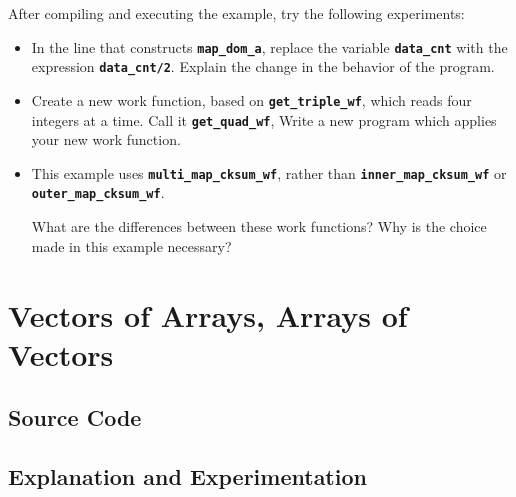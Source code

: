 \documentclass{report}
\begin{document}
After compiling and executing the example, try the following experiments:
\begin{itemize}
\item
In the line that constructs
\texttt{{\bf map\_dom\_a}},
replace the variable
\texttt{{\bf data\_cnt}}
with the expression
\texttt{{\bf data\_cnt/2}}.
Explain the change in the behavior of the program.

%

\item
Create a new work function, based on
\texttt{{\bf get\_triple\_wf}},
which reads four integers at a time.  Call it
\texttt{{\bf get\_quad\_wf}},
Write a new \stapl program which applies your new work function.

\item
This example uses
\texttt{{\bf multi\_map\_cksum\_wf}},
rather than
\linebreak[4] \texttt{{\bf inner\_map\_cksum\_wf}} or
\texttt{{\bf outer\_map\_cksum\_wf}}.

What are the differences between these work functions?  Why is the choice
made in this example necessary?

\end{itemize}


\pagebreak
\section{Vectors of Arrays, Arrays of Vectors}

\subsection{Source Code}



\subsection{Explanation and Experimentation}
\end{document}
